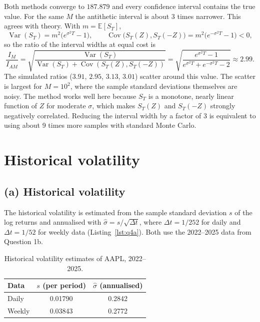 \documentclass[11pt,a4paper]{article}
\begin{document}
Both methods converge to $187.879$ and every confidence interval contains the true value. For
the same $M$ the antithetic interval is about 3 times narrower. This agrees with theory. With
$m = \mathbb E[S_T]$,
\[
  \operatorname{Var}(S_T) = m^2\big(e^{\sigma^2 T} - 1\big), \qquad
  \operatorname{Cov}\big(S_T(Z), S_T(-Z)\big) = m^2\big(e^{-\sigma^2 T} - 1\big) < 0,
\]
so the ratio of the interval widths at equal cost is
\[
  \frac{I_M}{I_{AM}} = \sqrt{\frac{\operatorname{Var}(S_T)}{\operatorname{Var}(S_T) + \operatorname{Cov}(S_T(Z),S_T(-Z))}}
  = \sqrt{\frac{e^{\sigma^2 T} - 1}{e^{\sigma^2 T} + e^{-\sigma^2 T} - 2}} \approx 2.99 .
\]
The simulated ratios ($3.91$, $2.95$, $3.13$, $3.01$) scatter around this value. The scatter is
largest for $M = 10^2$, where the sample standard deviations themselves are noisy. The method
works well here because $S_T$ is a monotone, nearly linear function of $Z$ for moderate $\sigma$,
which makes $S_T(Z)$ and $S_T(-Z)$ strongly negatively correlated. Reducing the interval width by
a factor of 3 is equivalent to using about 9 times more samples with standard Monte Carlo.

\section{Historical volatility}

\subsection*{(a) Historical volatility}

The historical volatility is estimated from the sample standard deviation $s$ of the log returns
and annualised with $\hat\sigma = s/\sqrt{\Delta t}$, where $\Delta t = 1/252$ for daily and
$\Delta t = 1/52$ for weekly data (Listing~\ref{lst:q4a}). Both use the 2022--2025 data from
Question 1b.

\begin{table}[H]
  \centering
  \begin{tabular}{lcc}
    \toprule
    Data & $s$ (per period) & $\hat\sigma$ (annualised) \\
    \midrule
    Daily  & 0.01790 & 0.2842 \\
    Weekly & 0.03843 & 0.2772 \\
    \bottomrule
  \end{tabular}
  \caption{Historical volatility estimates of AAPL, 2022--2025.}
  \label{tab:q4a}
\end{table}
\end{document}
